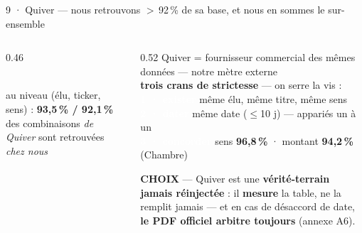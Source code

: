 \documentclass[11pt,aspectratio=169]{beamer}
\newcommand{\badge}[2]{\colorbox{#1}{\textcolor{white}{\footnotesize\textbf{#2}}}}
\newcommand{\choixbox}[1]{%
  \colorbox{alertred!8}{\parbox{\dimexpr\linewidth-8pt}{\scriptsize
    \textbf{\textcolor{alertred}{CHOIX}}\; --- #1}}}
\begin{document}
\begin{frame}{9 · Quiver --- nous retrouvons $>$\,92\,\% de sa base, et nous en sommes le sur-ensemble}
  \begin{columns}[c]
    \begin{column}{0.46\textwidth}\centering
      \\[1mm]
      {\scriptsize\color{black!60} au niveau (élu, ticker, sens) : \textbf{93,5\,\% /
       92,1\,\%} des combinaisons \emph{de Quiver} sont retrouvées \emph{chez nous}}
    \end{column}
    \begin{column}{0.52\textwidth}\footnotesize
      {\scriptsize\color{black!60} Quiver = fournisseur commercial des mêmes données ---
       notre mètre externe}\\[1.5mm]
      \textbf{trois crans de strictesse} --- on serre la vis :\\[1mm]
      {\scriptsize
      \badge{helec}{1 · exister} même élu, même titre, même sens\\[0.8mm]
      \badge{helec}{2 · dater} même date ($\leq$10 j) --- appariés un à un\\[0.8mm]
      \badge{helec}{3 · concorder} sens \textbf{96,8\,\%} · montant \textbf{94,2\,\%} (Chambre)}\\[2mm]
      \choixbox{Quiver est une \textbf{vérité-terrain jamais réinjectée} : il
       \textbf{mesure} la table, ne la remplit jamais --- et en cas de désaccord de
       date, \textbf{le PDF officiel arbitre toujours} (annexe A6).}
    \end{column}
  \end{columns}
\end{frame}
\end{document}
